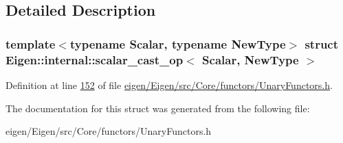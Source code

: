 \subsection{Detailed Description}
\subsubsection*{template$<$typename Scalar, typename New\+Type$>$\newline
struct Eigen\+::internal\+::scalar\+\_\+cast\+\_\+op$<$ Scalar, New\+Type $>$}



Definition at line \hyperlink{eigen_2_eigen_2src_2_core_2functors_2_unary_functors_8h_source_l00152}{152} of file \hyperlink{eigen_2_eigen_2src_2_core_2functors_2_unary_functors_8h_source}{eigen/\+Eigen/src/\+Core/functors/\+Unary\+Functors.\+h}.



The documentation for this struct was generated from the following file\+:\begin{DoxyCompactItemize}
\item 
eigen/\+Eigen/src/\+Core/functors/\+Unary\+Functors.\+h\end{DoxyCompactItemize}

